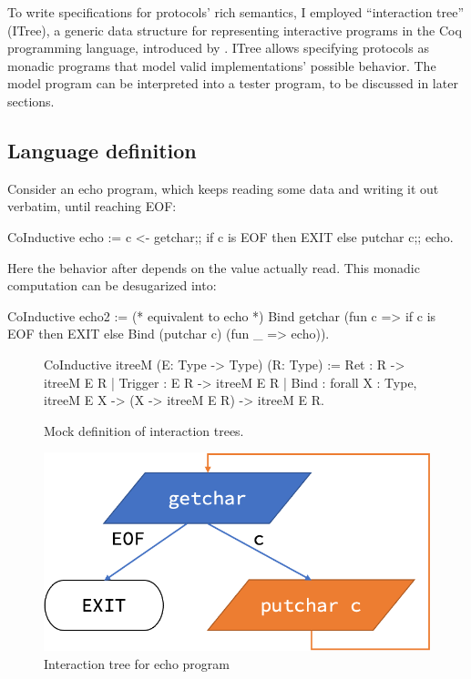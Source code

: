 To write specifications for protocols' rich semantics, I employed ``interaction
tree'' (ITree), a generic data structure for representing interactive programs
in the Coq programming language, introduced by \textcite{itree}.  ITree allows
specifying protocols as monadic programs that model valid implementations'
possible behavior.  The model program can be interpreted into a tester program,
to be discussed in later sections.

\subsection{Language definition}
\label{sec:itree-lang}
Consider an echo program, which keeps reading some data and writing it out
verbatim, until reaching EOF:
\begin{coq}
  CoInductive echo := c <- getchar;;
                      if c is EOF then EXIT
                      else putchar c;; echo.
\end{coq}

Here the behavior after  depends on the value actually read.  This
monadic computation can be desugarized into:
\begin{coq}
  CoInductive echo2 := (* equivalent to echo *)
    Bind getchar (fun c => if c is EOF then EXIT
                         else Bind (putchar c) (fun _ => echo)).
\end{coq}

\begin{figure}
\begin{coq}
  CoInductive itreeM (E: Type -> Type) (R: Type) :=
    Ret     : R   -> itreeM E R
  | Trigger : E R -> itreeM E R
  | Bind    : forall {X : Type}, itreeM E X -> (X -> itreeM E R) -> itreeM E R.
\end{coq}
\caption{Mock definition of interaction trees.}
\label{fig:mock-itree}
\end{figure}

\begin{figure}
  \includegraphics[width=.5\linewidth]{figures/echo-itree}
  \caption{Interaction tree for echo program}
  \label{fig:echo-itree}
\end{figure}

